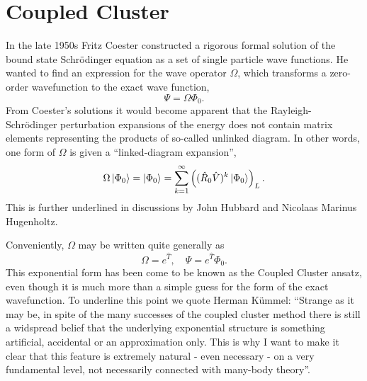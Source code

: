 \chapter{Coupled Cluster}
\label{ch:coupled_cluster_theory}

In the late 1950s Fritz Coester constructed a rigorous formal solution of the bound
state Schrödinger equation as a set of single particle wave
functions\cite{coester1958bound}. He wanted to find an expression for the wave operator 
$\Omega$, which transforms a zero-order wavefunction to the exact wave function,
\begin{equation}
    \Psi = \Omega \Phi_0.
\end{equation}
From Coester's solutions it would become apparent that the Rayleigh-Schrödinger 
perturbation expansions of the energy does not contain matrix elements representing 
the products of so-called unlinked diagram. In other words, one form of $\Omega$ is 
given a ``linked-diagram expansion'',
\begin{equation}
    \Omega\ket{\Phi_0} = \ket{\Phi_0} 
    = \sum_{k=1}^\infty\left((\hat{R}_0\hat{V})^k \ket{{\Phi_0}} \right)_L.
\end{equation}
This is further underlined in discussions by John Hubbard\cite{hubbard1957description}
and Nicolaas Marinus Hugenholtz\cite{hugenholtz1957perturbation}.

Conveniently, $\Omega$ may be written quite generally as
\begin{equation}
    \Omega = e^{\hat{T}}, \quad \Psi = e^{\hat{T}}\Phi_0.
\end{equation}
This exponential form has been come to be known as the Coupled Cluster ansatz, even 
though it is much more than a simple guess for the form of the exact wavefunction.
To underline this point we quote Herman Kümmel: ``Strange as it may be, in spite of
the many successes of the coupled cluster method there is still a widspread belief
that the underlying exponential structure is something artificial, accidental or 
an approximation only. This is why I want to make it clear that this feature is 
extremely natural - even necessary - on a very fundamental level, not necessarily
connected with many-body theory''\cite{kummel1991origins}. 

